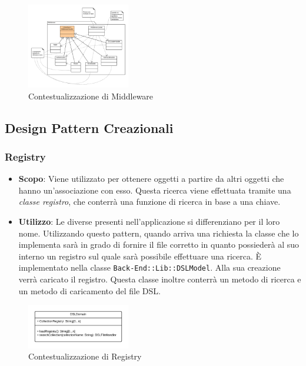 \begin{figure}[H]
\centering \includegraphics[width=0.4\textwidth]{patterns/contestualizzazione/middleware.png}
\caption{Contestualizzazione di Middleware}
\label{fig:mvc}
\end{figure}

\subsection{Design Pattern Creazionali}

\subsubsection{Registry}

\begin{itemize}

	\item \textbf{Scopo}: Viene utilizzato per ottenere oggetti a partire da altri oggetti che hanno un'associazione con esso. Questa ricerca viene effettuata tramite una \textit{classe registro}, che conterrà una funzione di ricerca in base a una chiave.
	\item \textbf{Utilizzo}: Le diverse  presenti nell'applicazione si differenziano per il loro nome. Utilizzando questo pattern, quando arriva una richiesta la classe che lo implementa sarà in grado di fornire il file  corretto in quanto possiederà al suo interno un registro sul quale sarà possibile effettuare una ricerca. È implementato nella classe \texttt{Back-End::Lib::DSLModel}. Alla sua creazione verrà caricato il registro. Questa classe inoltre conterrà un metodo di ricerca e un metodo di caricamento del file DSL.

\end{itemize}

\begin{figure}[H]
\centering \includegraphics[width=0.4\textwidth]{patterns/contestualizzazione/registry.png}
\caption{Contestualizzazione di Registry}
\label{fig:mvc}
\end{figure}

